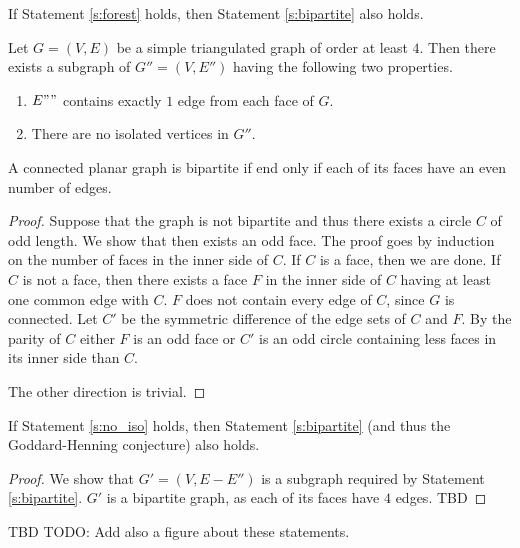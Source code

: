 \begin{remark}
  If Statement \ref{s:forest} holds, then Statement \ref{s:bipartite} also holds.
\end{remark}

\begin{guess}\label{s:no_iso}
  Let $G = (V, E)$ be a simple triangulated graph of order at least $4$. Then there
  exists a subgraph of $G'' = (V, E'')$ having the following two properties.
  \begin{enumerate}
    \item $E""$ contains exactly $1$ edge from each face of $G$.
    \item There are no isolated vertices in $G''$.
  \end{enumerate}
\end{guess}

\begin{lemma}
  A connected planar graph is bipartite if end only if each of its faces have an
  even number of edges.
\end{lemma}
\begin{proof}
  Suppose that the graph is not bipartite and thus there exists a circle $C$ of odd
  length. We show that then exists an odd face. The proof goes by induction on the
  number of faces in the inner side of $C$. If $C$ is a face, then we are done.
  If $C$ is not a face, then there exists a face $F$ in the inner side of $C$ having at least one
  common edge with $C$. $F$ does not contain every edge of $C$, since $G$ is connected.
  Let $C'$ be the symmetric difference of the edge sets of $C$ and $F$. By the parity of $C$
  either $F$ is an odd face or $C'$ is an odd circle containing less faces in its
  inner side than $C$.

  The other direction is trivial.
\end{proof}

\begin{claim}
  If Statement \ref{s:no_iso} holds, then Statement \ref{s:bipartite} (and thus
  the Goddard-Henning conjecture) also holds.
\end{claim}
\begin{proof}
  We show that $G' = (V, E - E'')$ is a subgraph required by Statement \ref{s:bipartite}.
  $G'$ is a bipartite graph, as each of its faces have $4$ edges.
  TBD
\end{proof}

TBD
TODO: Add also a figure about these statements.

